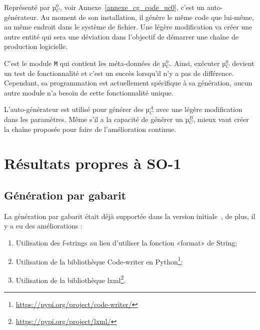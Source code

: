 Représenté par µ$_C^0$, voir Annexe~\ref{annexe_cg_code_uc0}, c’est un auto-générateur. Au moment de son installation, il génère le même code que lui-même, au même endroit dans le système de fichier. Une légère modification va créer une autre entité qui sera une déviation dans l’objectif de démarrer une chaîne de production logicielle.

C'est le module \texttt{M} qui contient les méta-données de µ$_C^0$. Ainsi, exécuter µ$_C^0$ devient un test de fonctionnalité et c'est un succès lorsqu'il n'y a pas de différence. Cependant, sa programmation est actuellement spécifique à sa génération, aucun autre module n’a besoin de cette fonctionnalité unique.




L'auto-générateur est utilisé pour générer des µ$_C^A$ avec une légère modification dans les paramètres. Même s'il a la capacité de générer un µ$_C^B$, mieux vaut créer la chaîne proposée pour faire de l'amélioration continue.

\section{Résultats propres à SO-1}

\subsection{Génération par gabarit}

La génération par gabarit était déjà supportée dans la version initiale~\cite{bluiksnot_repo}, de plus, il y a eu des améliorations :
\begin{enumerate}
    \item Utilisation des f-strings au lieu d'utiliser la fonction «format» de String;
    \item Utilisation de la bibliothèque Code-writer en Python\footnote{\url{https://pypi.org/project/code-writer/}};
    \item Utilisation de la bibliothèque lxml\footnote{\url{https://pypi.org/project/lxml/}}.
\end{enumerate}

